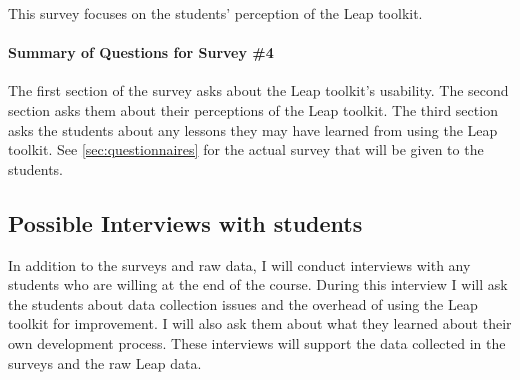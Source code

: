 This survey focuses on the students' perception of the Leap toolkit. 
\paragraph{Summary of Questions for Survey \#4}
The first section of the survey asks about the Leap toolkit's usability.  The
second section asks them about their perceptions of the Leap toolkit.  The
third section asks the students about any lessons they may have learned from
using the Leap toolkit.  See \ref{sec:questionnaires} for the actual survey
that will be given to the students.

\subsection{Possible Interviews with students}

In addition to the surveys and raw data, I will conduct interviews with any
students who are willing at the end of the course.  During this interview I will 
ask the students about data collection issues and the overhead of using the
Leap toolkit for improvement.  I will also ask them about what they learned
about their own development process.  These interviews will support the data
collected in the surveys and the raw Leap data.
 




